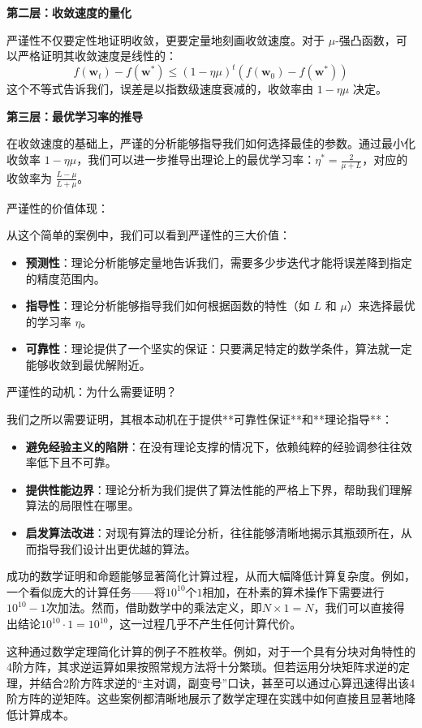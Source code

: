 \textbf{第二层：收敛速度的量化}

严谨性不仅要定性地证明收敛，更要定量地刻画收敛速度。对于 $\mu$-强凸函数，可以严格证明其收敛速度是线性的：
$$f(\mathbf{w}_t) - f(\mathbf{w}^*) \leq \left(1 - \eta\mu\right)^t (f(\mathbf{w}_0) - f(\mathbf{w}^*))$$
这个不等式告诉我们，误差是以指数级速度衰减的，收敛率由 $1-\eta\mu$ 决定。

\textbf{第三层：最优学习率的推导}

在收敛速度的基础上，严谨的分析能够指导我们如何选择最佳的参数。通过最小化收敛率 $1-\eta\mu$，我们可以进一步推导出理论上的最优学习率：$\eta^* = \frac{2}{\mu + L}$，对应的收敛率为 $\frac{L-\mu}{L+\mu}$。

严谨性的价值体现：

从这个简单的案例中，我们可以看到严谨性的三大价值：

\begin{itemize}
\item \textbf{预测性}：理论分析能够定量地告诉我们，需要多少步迭代才能将误差降到指定的精度范围内。
\item \textbf{指导性}：理论分析能够指导我们如何根据函数的特性（如 $L$ 和 $\mu$）来选择最优的学习率 $\eta$。
\item \textbf{可靠性}：理论提供了一个坚实的保证：只要满足特定的数学条件，算法就一定能够收敛到最优解附近。
\end{itemize}

严谨性的动机：为什么需要证明？

我们之所以需要证明，其根本动机在于提供**可靠性保证**和**理论指导**：

\begin{itemize}
\item \textbf{避免经验主义的陷阱}：在没有理论支撑的情况下，依赖纯粹的经验调参往往效率低下且不可靠。
\item \textbf{提供性能边界}：理论分析为我们提供了算法性能的严格上下界，帮助我们理解算法的局限性在哪里。
\item \textbf{启发算法改进}：对现有算法的理论分析，往往能够清晰地揭示其瓶颈所在，从而指导我们设计出更优越的算法。
\end{itemize}

成功的数学证明和命题能够显著简化计算过程，从而大幅降低计算复杂度。例如，一个看似庞大的计算任务——将$10^{10}$个$1$相加，在朴素的算术操作下需要进行$10^{10}-1$次加法。然而，借助数学中的乘法定义，即$N \times 1 = N$，我们可以直接得出结论$10^{10} \cdot 1 = 10^{10}$，这一过程几乎不产生任何计算代价。

这种通过数学定理简化计算的例子不胜枚举。例如，对于一个具有分块对角特性的4阶方阵，其求逆运算如果按照常规方法将十分繁琐。但若运用分块矩阵求逆的定理，并结合2阶方阵求逆的“主对调，副变号”口诀，甚至可以通过心算迅速得出该4阶方阵的逆矩阵。这些案例都清晰地展示了数学定理在实践中如何直接且显著地降低计算成本。

